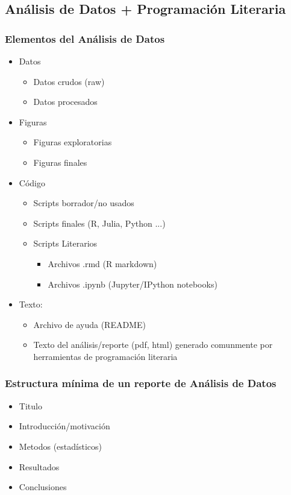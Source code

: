 \documentclass[sans serif,9pt,xcolor=dvipsnames]{beamer}%
\begin{document}
\subsection{Análisis de Datos + Programación Literaria}
\begin{frame}
\frametitle{Elementos del Análisis de Datos }
\justifying
\begin{block}{}
\begin{itemize}
\item Datos
  \begin{itemize}
  \item Datos crudos (raw)
  \item Datos procesados
  \end{itemize}
\item Figuras
\begin{itemize}
  \item Figuras exploratorias
  \item Figuras finales
\end{itemize}
\item Código
\begin{itemize}
  \item Scripts borrador/no usados
  \item Scripts finales (R, Julia, Python ...)
  \item Scripts Literarios 
\begin{itemize}
    \item Archivos .rmd (R markdown)
    \item Archivos .ipynb (Jupyter/IPython notebooks)
\end{itemize}    
\end{itemize}
\item Texto:
\begin{itemize}
  \item Archivo de ayuda (README)
  \item Texto del análisis/reporte (pdf, html) generado comunmente por  herramientas de programación literaria
 \end{itemize}
\end{itemize}
\end{block}
\end{frame}

\begin{frame}
\frametitle{Estructura mínima de un reporte de Análisis de Datos}
\justifying
\begin{block}{}
\begin{itemize}
\item \Large Titulo
\item \Large Introducción/motivación
\item \Large Metodos (estadísticos)
\item \Large Resultados
\item \Large Conclusiones
\end{itemize}
\end{block}
\end{frame}
\end{document}
